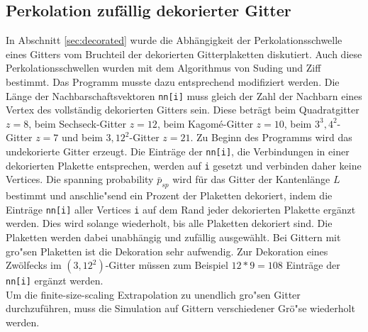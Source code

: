 \subsection{Perkolation zuf\"allig dekorierter Gitter}
In Abschnitt \ref{sec:decorated} wurde die Abh\"angigkeit der Perkolationsschwelle eines Gitters vom Bruchteil der dekorierten Gitterplaketten diskutiert. Auch diese Perkolationsschwellen wurden mit dem Algorithmus von Suding und Ziff bestimmt. Das Programm musste dazu entsprechend modifiziert werden. Die L\"ange der Nachbarschaftsvektoren \texttt{nn[i]} muss gleich der Zahl der Nachbarn eines Vertex des vollst\"andig dekorierten Gitters sein. Diese betr\"agt beim Quadratgitter $z=8$, beim Sechseck-Gitter $z=12$, beim Kagom\'e-Gitter $z=10$, beim $3^3,4^2$-Gitter $z=7$ und beim $3,12^2$-Gitter $z=21$. Zu Beginn des Programms wird das undekorierte Gitter erzeugt. Die Eintr\"age der \texttt{nn[i]}, die Verbindungen in einer dekorierten Plakette entsprechen, werden auf \texttt{i} gesetzt und verbinden daher keine Vertices.  Die spanning probability $\bar{p}_{sp}$ wird f\"ur das Gitter der Kantenl\"ange $L$ bestimmt und anschlie"send ein Prozent der Plaketten dekoriert, indem die Eintr\"age \texttt{nn[i]} aller Vertices \texttt{i} auf dem Rand jeder dekorierten Plakette erg\"anzt werden. Dies wird solange wiederholt, bis alle Plaketten dekoriert sind. Die Plaketten werden dabei unabh\"angig und zuf\"allig ausgew\"ahlt. Bei Gittern mit gro"sen Plaketten ist die Dekoration sehr aufwendig. Zur Dekoration eines Zw\"olfecks im $(3,12^2)$-Gitter m\"ussen zum Beispiel $12*9=108$ Eintr\"age der \texttt{nn[i]} erg\"anzt werden.\\
Um die finite-size-scaling Extrapolation zu unendlich gro"sen Gitter durchzuf\"uhren, muss die Simulation auf Gittern verschiedener Gr\"o"se wiederholt werden.

